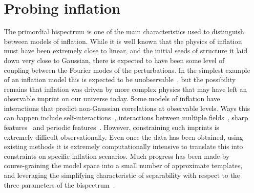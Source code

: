 %
\chapter{Probing inflation}\label{chapter:intro_bispectra}
The primordial bispectrum is one of the main
characteristics used to distinguish between models of inflation. While it is well
known that the physics of inflation must have been extremely close
to linear, and the initial seeds of structure it laid down
very close to Gaussian, there is expected to have been some level of coupling
between the Fourier modes of the perturbations.
In the simplest example of an inflation model this is
expected to be unobservable~\cite{Maldacena},
but the possibility remains that inflation was driven by
more complex physics that may have left an observable imprint on our universe today.
Some models of inflation have interactions that predict non-Gaussian
correlations at observable levels. Ways this can happen include
self-interactions~\cite{px_burrage,dbi_in_the_sky},
interactions between multiple fields~\cite{Byrnes_2010},
sharp features~\cite{adshead}
and periodic features~\cite{flauger_pajer_resonant, Pajer_2013, Meerburg_2012, Meerburg_osc, Meerburg_2010,
Barnaby_2011, Peiris_2013, Easther_2013}.
However, constraining such imprints is extremely difficult observationally.
Even once the data has been obtained, using existing methods it is
extremely computationally intensive to translate this into constraints
on specific inflation scenarios. Much progress has been made by course-graining
the model space into a small number of approximate templates,
and leveraging the simplifying characteristic of separability
with respect to the three parameters of the bispectrum~\cite{Komatsu_2005, Munchmeyer_2014}.


